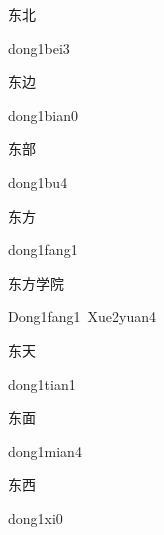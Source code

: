 \begin{multicols*}{2}
\begin{verbete}{东北}
\begin{pronuncia}{dong1bei3}
\end{pronuncia}
\end{verbete}

\begin{verbete}{东边}
\begin{pronuncia}{dong1bian0}
\end{pronuncia}
\end{verbete}

\begin{verbete}[dong1bu4]{东部}
\begin{pronuncia}{dong1bu4}
\end{pronuncia}
\end{verbete}

\begin{verbete}{东方}
\begin{pronuncia}{dong1fang1}
\end{pronuncia}
\end{verbete}

\begin{verbete}{东方学院}
\begin{pronuncia}[\\]{Dong1fang1\ Xue2yuan4}
\end{pronuncia}
\end{verbete}

\begin{verbete}{东天}
\begin{pronuncia}{dong1tian1}
\end{pronuncia}
\end{verbete}

\begin{verbete}{东面}
\begin{pronuncia}{dong1mian4}
\end{pronuncia}
\end{verbete}

\begin{verbete}[dong1xi0]{东西}
\begin{pronuncia}{dong1xi0}
\end{pronuncia}
\end{verbete}


\end{multicols*}
